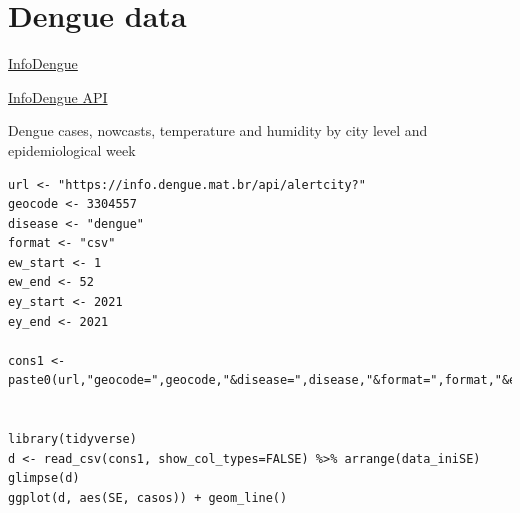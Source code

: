 \documentclass[
  letterpaper,
  DIV=11,
  numbers=noendperiod]{scrreprt}
\newenvironment{Shaded}{\begin{snugshade}}{\end{snugshade}}
\newcommand{\AttributeTok}[1]{\textcolor[rgb]{0.40,0.45,0.13}{#1}}
\newcommand{\CommentTok}[1]{\textcolor[rgb]{0.37,0.37,0.37}{#1}}
\newcommand{\ConstantTok}[1]{\textcolor[rgb]{0.56,0.35,0.01}{#1}}
\newcommand{\DecValTok}[1]{\textcolor[rgb]{0.68,0.00,0.00}{#1}}
\newcommand{\FunctionTok}[1]{\textcolor[rgb]{0.28,0.35,0.67}{#1}}
\newcommand{\NormalTok}[1]{\textcolor[rgb]{0.00,0.23,0.31}{#1}}
\newcommand{\OtherTok}[1]{\textcolor[rgb]{0.00,0.23,0.31}{#1}}
\newcommand{\SpecialCharTok}[1]{\textcolor[rgb]{0.37,0.37,0.37}{#1}}
\newcommand{\StringTok}[1]{\textcolor[rgb]{0.13,0.47,0.30}{#1}}
\begin{document}
\begin{Shaded}
\end{Shaded}

\hypertarget{dengue-data}{%
\section{Dengue data}\label{dengue-data}}

\href{https://info.dengue.mat.br/}{InfoDengue}

\href{https://info.dengue.mat.br/services/tutorial/R}{InfoDengue API}

Dengue cases, nowcasts, temperature and humidity by city level and
epidemiological week

\begin{verbatim}
url <- "https://info.dengue.mat.br/api/alertcity?"
geocode <- 3304557
disease <- "dengue"
format <- "csv"
ew_start <- 1
ew_end <- 52
ey_start <- 2021
ey_end <- 2021

cons1 <- paste0(url,"geocode=",geocode,"&disease=",disease,"&format=",format,"&ew_start=",ew_start,"&ew_end=",ew_end,"&ey_start=",ey_start,"&ey_end=",ey_end)


library(tidyverse)
d <- read_csv(cons1, show_col_types=FALSE) %>% arrange(data_iniSE)
glimpse(d)
ggplot(d, aes(SE, casos)) + geom_line()
\end{verbatim}
\end{document}
